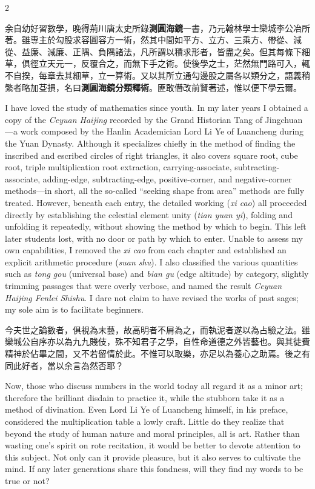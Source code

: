 \documentclass[11pt,a4paper]{article}
\begin{document}
\begin{paracol}{2}
\switchcolumn

余自幼好習數學，晚得荊川唐太史所錄\textbf{測圓海鏡}一書，乃元翰林學士欒城李公冶所著。雖專主於勾股求容圓容方一術，然其中間如平方、立方、三乘方、帶從、減從、益廉、減廉、正隅、負隅諸法，凡所謂以積求形者，皆盡之矣。但其每條下細草，俱徑立天元一，反覆合之，而無下手之術。使後學之士，茫然無門路可入，輒不自揆，每章去其細草，立一算術。又以其所立通勾邊股之屬各以類分之，語義稍繁者略加芟損，名曰\textbf{測圓海鏡分類釋術}。匪敢僭改前賢著述，惟以便下學云爾。

\switchcolumn

I have loved the study of mathematics since youth. In my later years I obtained a copy of the \textit{Ceyuan Haijing} recorded by the Grand Historian Tang of Jingchuan---a work composed by the Hanlin Academician Lord Li Ye of Luancheng during the Yuan Dynasty. Although it specializes chiefly in the method of finding the inscribed and escribed circles of right triangles, it also covers square root, cube root, triple multiplication root extraction, carrying-associate, subtracting-associate, adding-edge, subtracting-edge, positive-corner, and negative-corner methods---in short, all the so-called ``seeking shape from area'' methods are fully treated. However, beneath each entry, the detailed working (\textit{xi cao}) all proceeded directly by establishing the celestial element unity (\textit{tian yuan yi}), folding and unfolding it repeatedly, without showing the method by which to begin. This left later students lost, with no door or path by which to enter. Unable to assess my own capabilities, I removed the \textit{xi cao} from each chapter and established an explicit arithmetic procedure (\textit{suan shu}). I also classified the various quantities such as \textit{tong gou} (universal base) and \textit{bian gu} (edge altitude) by category, slightly trimming passages that were overly verbose, and named the result \textit{Ceyuan Haijing Fenlei Shishu}. I dare not claim to have revised the works of past sages; my sole aim is to facilitate beginners.

\switchcolumn

今夫世之論數者，俱視為末藝，故高明者不屑為之，而執泥者遂以為占驗之法。雖欒城公自序亦以為九九賤伎，殊不知君子之學，自性命道德之外皆藝也。與其徒費精神於佔畢之間，又不若留情於此。不惟可以取樂，亦足以為養心之助焉。後之有同此好者，當以余言為然否耶？

\switchcolumn

Now, those who discuss numbers in the world today all regard it as a minor art; therefore the brilliant disdain to practice it, while the stubborn take it as a method of divination. Even Lord Li Ye of Luancheng himself, in his preface, considered the multiplication table a lowly craft. Little do they realize that beyond the study of human nature and moral principles, all is art. Rather than wasting one's spirit on rote recitation, it would be better to devote attention to this subject. Not only can it provide pleasure, but it also serves to cultivate the mind. If any later generations share this fondness, will they find my words to be true or not?


\end{paracol}
\end{document}
